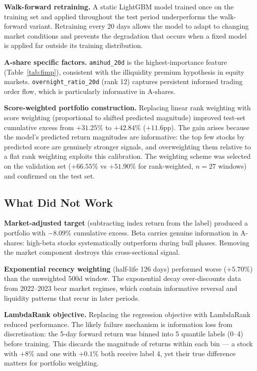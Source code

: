 \documentclass[11pt,a4paper]{article}
\begin{document}
\textbf{Walk-forward retraining.} A static LightGBM model trained once on
the training set and applied throughout the test period underperforms the
walk-forward variant. Retraining every 20 days allows the model to adapt
to changing market conditions and prevents the degradation that occurs
when a fixed model is applied far outside its training distribution.

\textbf{A-share specific factors.} \texttt{amihud\_20d} is the
highest-importance feature (Table~\ref{tab:fimp}), consistent with the
illiquidity premium hypothesis in equity markets.
\texttt{overnight\_ratio\_20d} (rank 12) captures persistent informed
trading order flow, which is particularly informative in A-shares.

\textbf{Score-weighted portfolio construction.} Replacing linear rank
weighting with score weighting (proportional to shifted predicted magnitude)
improved test-set cumulative excess from $+31.25\%$ to $+42.84\%$ ($+11.6$pp).
The gain arises because the model's predicted return magnitudes are informative:
the top few stocks by predicted score are genuinely stronger signals, and
overweighting them relative to a flat rank weighting exploits this calibration.
The weighting scheme was selected on the validation set ($+66.55\%$ vs
$+51.90\%$ for rank-weighted, $n=27$ windows) and confirmed on the test set.

\subsection{What Did Not Work}

\textbf{Market-adjusted target} (subtracting index return from the label)
produced a portfolio with $-8.09\%$ cumulative excess. Beta carries genuine
information in A-shares: high-beta stocks systematically outperform during
bull phases. Removing the market component destroys this cross-sectional
signal.

\textbf{Exponential recency weighting} (half-life 126 days) performed worse
($+5.70\%$) than the unweighted 500d window. The exponential decay
over-discounts data from 2022--2023 bear market regimes, which contain
informative reversal and liquidity patterns that recur in later periods.

\textbf{LambdaRank objective.} Replacing the regression objective with
LambdaRank reduced performance. The likely failure mechanism is
information loss from discretisation: the 5-day forward return was binned
into 5 quantile labels (0--4) before training. This discards the
magnitude of returns within each bin --- a stock with $+8\%$ and one with
$+0.1\%$ both receive label 4, yet their true difference matters for
portfolio weighting.
\end{document}
